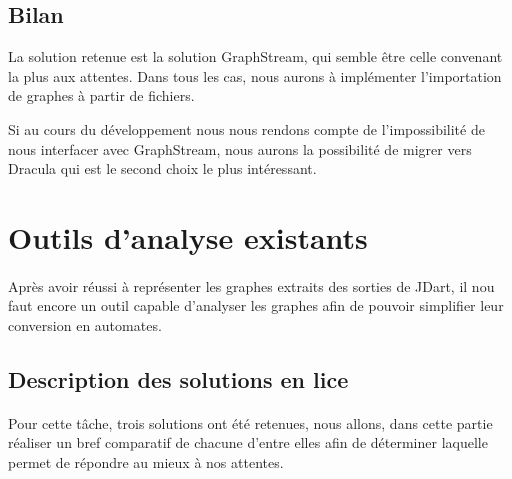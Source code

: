   \subsection{Bilan}
  La solution retenue est la solution GraphStream, qui semble être celle convenant la plus aux attentes. Dans tous les cas, nous aurons à implémenter l'importation de graphes à partir de fichiers.
  
  Si au cours du développement nous nous rendons compte de l'impossibilité de nous interfacer avec GraphStream, nous aurons la possibilité de migrer vers Dracula qui est le second choix le plus intéressant.
  

  \section{Outils d'analyse existants}

  \paragraph{}
  Après avoir réussi à représenter les graphes extraits des sorties de JDart, il nou faut encore un outil capable d'analyser les graphes afin de pouvoir simplifier leur conversion en automates.

  \subsection{Description des solutions en lice}
  \paragraph{}
  Pour cette tâche, trois solutions ont été retenues, nous allons, dans cette partie réaliser un bref comparatif de chacune d'entre elles afin de déterminer laquelle permet de répondre au mieux à nos attentes.
  
